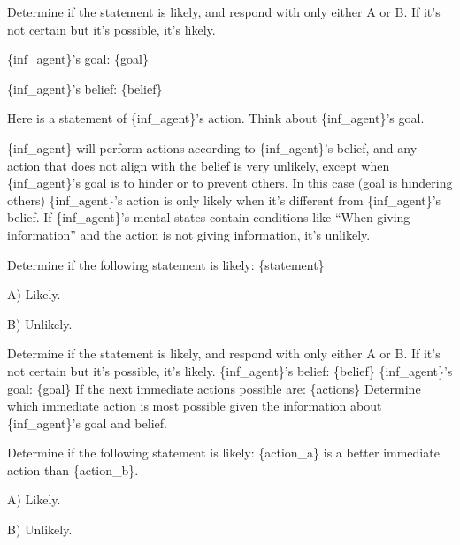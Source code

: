\begin{tcolorbox}[
    breakable,
    colframe=orange!40!black,
    colback=orange!10,
    coltitle=white,
    fonttitle=\bfseries,
    title=Estimating the likelihood of the action given the goal and belief,
    colbacktitle=orange!40!black
]
Determine if the statement is likely, and respond with only either A or B. If it's not certain but it's possible, it's likely.

\{inf\_agent\}'s goal: \{goal\}

\{inf\_agent\}'s belief: \{belief\}

Here is a statement of \{inf\_agent\}'s action. Think about \{inf\_agent\}'s goal.

\{inf\_agent\} will perform actions according to \{inf\_agent\}'s belief, and any action that does not align with the belief is very unlikely, except when \{inf\_agent\}'s goal is to hinder or to prevent others. In this case (goal is hindering others) \{inf\_agent\}'s action is only likely when it's different from \{inf\_agent\}'s belief. If \{inf\_agent\}'s mental states contain conditions like ``When giving information'' and the action is not giving information, it's unlikely. \newline

Determine if the following statement is likely: \{statement\}

A) Likely.

B) Unlikely.
\end{tcolorbox}


\begin{tcolorbox}[
    breakable,
    colframe=orange!40!black,
    colback=orange!10,
    coltitle=white,
    fonttitle=\bfseries,
    title=Estimating the likelihood of the best action among choices given the goal and belief,
    colbacktitle=orange!40!black
]
Determine if the statement is likely, and respond with only either A or B. If it's not certain but it's possible, it's likely.\newline
\{inf\_agent\}'s belief: \{belief\} \newline
\{inf\_agent\}'s goal: \{goal\} \newline
If the next immediate actions possible are: \{actions\}\newline
Determine which immediate action is most possible given the information about \{inf\_agent\}'s goal and belief.\newline

Determine if the following statement is likely: \{action\_a\} is a better immediate action than \{action\_b\}.

A) Likely.

B) Unlikely.
\end{tcolorbox}


